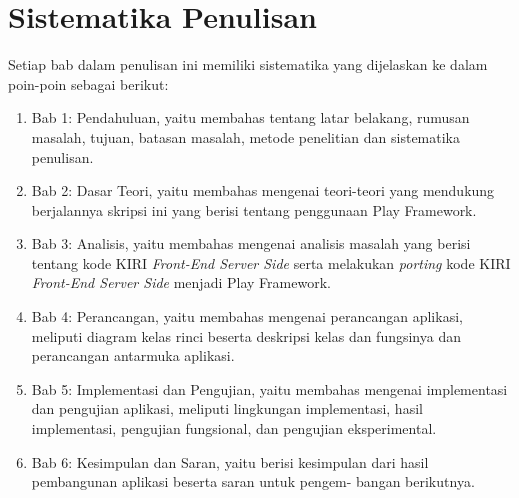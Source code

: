 \section{Sistematika Penulisan}
\label{sec:sistematikaPenulisan}
Setiap bab dalam penulisan ini memiliki sistematika yang dijelaskan ke dalam poin-poin sebagai berikut:
	\begin{enumerate}
		\item Bab 1: Pendahuluan, yaitu membahas tentang latar belakang, rumusan masalah, tujuan, batasan masalah, metode penelitian dan sistematika penulisan.
		\item Bab 2: Dasar Teori, yaitu membahas mengenai teori-teori yang mendukung berjalannya skripsi ini yang berisi tentang penggunaan Play Framework.
		\item Bab 3: Analisis, yaitu membahas mengenai analisis masalah yang berisi tentang kode KIRI \textit{Front-End Server Side} serta melakukan \textit{porting} kode KIRI \textit{Front-End Server Side} menjadi Play Framework.
	\item Bab 4: Perancangan, yaitu membahas mengenai perancangan aplikasi, meliputi diagram kelas rinci beserta deskripsi kelas dan fungsinya dan perancangan antarmuka aplikasi.
	\item Bab 5: Implementasi dan Pengujian, yaitu membahas mengenai implementasi dan pengujian aplikasi, meliputi lingkungan implementasi, hasil implementasi, pengujian fungsional, dan pengujian eksperimental.
	\item Bab 6: Kesimpulan dan Saran, yaitu berisi kesimpulan dari hasil pembangunan aplikasi beserta saran untuk pengem- bangan berikutnya.
	\end{enumerate}
		